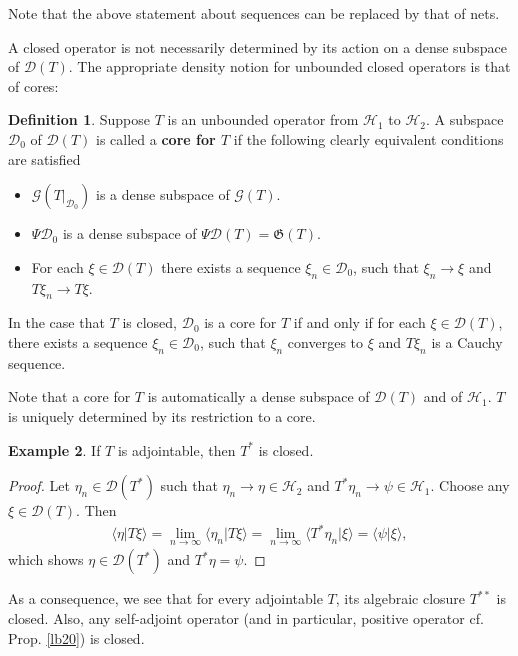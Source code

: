 \documentclass[12pt,a4paper,notitlepage]{article}
\theoremstyle{definition}
\newtheorem{df}{Definition}[section]
\newtheorem{eg}[df]{Example}
\theoremstyle{plain}
\newcommand{\fk}{\mathfrak}
\newcommand{\mc}{\mathcal}
\newcommand{\Dom}{\scr D}
\newcommand{\bk}[1]{\langle {#1}\rangle}
\newcommand{\scr}{\mathscr}
\numberwithin{equation}{section}
\begin{document}
Note that the above statement about sequences can be replaced by that of nets.


A closed operator is not necessarily determined by its action on a dense subspace of $\Dom(T)$. The appropriate density notion for unbounded closed operators is that of cores:

\begin{df}
Suppose $T$ is an unbounded operator from $\mc H_1$ to $\mc H_2$. A  subspace $\Dom_0$ of $\Dom(T)$ is called a \textbf{core for $T$} if the following clearly equivalent conditions are satisfied
\begin{itemize}
		\item $\scr G(T|_{\Dom_0})$ is a dense subspace of $\scr G(T)$.
		\item $\Psi\Dom_0$ is a dense subspace of $\Psi\Dom(T)=\fk G(T)$.
		\item For each $\xi\in\Dom(T)$ there exists a sequence $\xi_n\in\Dom_0$, such that $\xi_n\rightarrow\xi$ and $T\xi_n\rightarrow T\xi$.
\end{itemize} 
In the case that $T$ is closed, $\Dom_0$ is a core for $T$ if and only if for each $\xi\in\Dom(T)$, there exists a sequence $\xi_n\in\Dom_0$, such that $\xi_n$ converges to $\xi$ and $T\xi_n$ is a Cauchy sequence.
\end{df}

Note that a core for $T$ is automatically a dense subspace of $\Dom(T)$ and of $\mc H_1$. $T$ is uniquely determined by its restriction to a core.










\begin{eg}\label{lb23}
If $T$ is adjointable, then $T^*$ is closed.
\end{eg}

\begin{proof}
Let $\eta_n\in\Dom(T^*)$ such that $\eta_n\rightarrow\eta\in\mc H_2$ and $T^*\eta_n\rightarrow\psi\in\mc H_1$. Choose any $\xi\in\Dom(T)$. Then
\begin{align*}
\bk{\eta|T\xi}=\lim_{n\rightarrow\infty}\bk{\eta_n|T\xi}=\lim_{n\rightarrow\infty}\bk{T^*\eta_n|\xi}=\bk{\psi|\xi},
\end{align*}
which shows $\eta\in\Dom(T^*)$ and $T^*\eta=\psi$.
\end{proof}

As a consequence, we see that for every adjointable $T$, its algebraic closure $T^{**}$ is closed. Also, any self-adjoint operator (and in particular, positive operator cf. Prop. \ref{lb20}) is closed.
\end{document}

